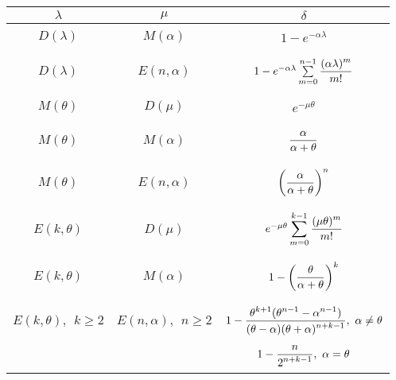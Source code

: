 \begin{multicols}{2}
\begin{table*}\small %
\begin{center}
\vspace*{2ex}

\begin{tabular}{|c|c|c|}
\hline
$\lambda$&$\mu$&$\delta$\\
\hline
&&\\[-9pt]
$D(\lambda)$&$M(\alpha)$&$1-e^{-\alpha\lambda}$\\
&&\\[-9pt]
\hline
&&\\[-9pt]
$D(\lambda)$&$E(n,\alpha)$&$1-e^{-\alpha\lambda}\sum\limits_{m=0}^{n-1}\displaystyle\displaystyle\frac{\displaystyle (\alpha\lambda)^m\mathstrut}{\displaystyle m!\mathstrut}$\\
&&\\[-9pt]
\hline
&&\\[-9pt]
$M(\theta)$&$D(\mu)$&$e^{-\mu\theta}$\\
&&\\[-9pt]
\hline
&&\\[-9pt]
$M(\theta)$&$M(\alpha)$&$\displaystyle\displaystyle\frac{\displaystyle \alpha\mathstrut}{\displaystyle \alpha+\theta\mathstrut}$\\
&&\\[-9pt]
\hline
&&\\[-9pt]
$M(\theta)$&$E(n,\alpha)$&$\left(\displaystyle\displaystyle\frac{\displaystyle \alpha\mathstrut}{\displaystyle \alpha+\theta\mathstrut}\right)^n$\\
&&\\[-9pt]
\hline
&&\\[-9pt]
$E(k,\theta)$&$D(\mu)$&$e^{-\mu\theta}\displaystyle\sum\limits_{m=0}^{k-1}\displaystyle\displaystyle\frac{\displaystyle (\mu\theta)^m\mathstrut}{\displaystyle m!\mathstrut}$\\
&&\\[-9pt]
\hline
&&\\[-9pt]
$E(k,\theta)$&$M(\alpha)$&$1-\left(\displaystyle\displaystyle\frac{\displaystyle \theta\mathstrut}{\displaystyle \alpha+\theta\mathstrut}\right)^k$\\
&&\\[-9pt]
\hline
&&\\[-9pt]
$E(k,\theta),\ \ k\ge2$&$E(n,\alpha),\ \ n\ge2$&$1-\displaystyle\displaystyle\frac{\displaystyle \theta^{k+1}(\theta^{n-1}-\alpha^{n-1})\mathstrut}{\displaystyle (\theta-\alpha)
(\theta+\alpha)^{n+k-1}\mathstrut},\ \alpha\neq\theta$\\
&&$\displaystyle1-\displaystyle\frac{\displaystyle n\mathstrut}{\displaystyle 2^{n+k-1}\mathstrut},\  \alpha=\theta$\\
\hline
\end{tabular}
\end{center}
\end{table*}


\end{multicols}

